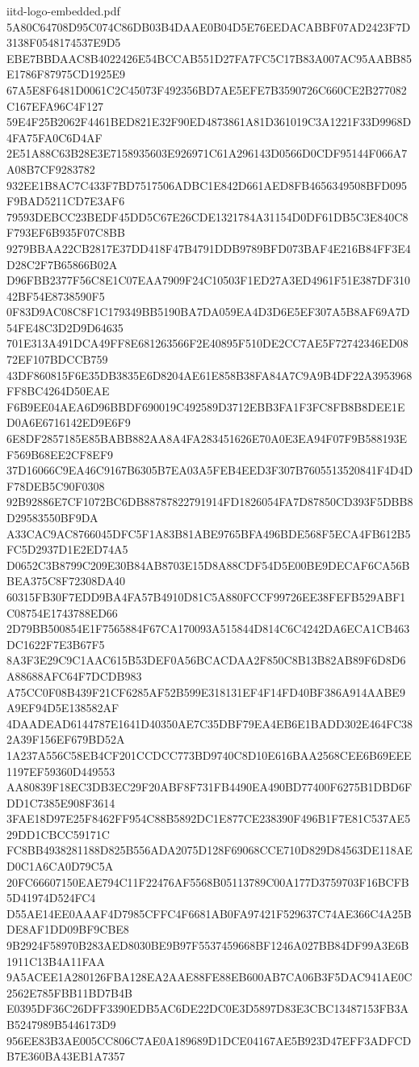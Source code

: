 \begin{filecontents*}[overwrite]{iitd-logo-embedded.pdf}
5A80C64708D95C074C86DB03B4DAAE0B04D5E76EEDACABBF07AD2423F7D3138F0548174537E9D5
EBE7BBDAAC8B4022426E54BCCAB551D27FA7FC5C17B83A007AC95AABB85E1786F87975CD1925E9
67A5E8F6481D0061C2C45073F492356BD7AE5EFE7B3590726C660CE2B277082C167EFA96C4F127
59E4F25B2062F4461BED821E32F90ED4873861A81D361019C3A1221F33D9968D4FA75FA0C6D4AF
2E51A88C63B28E3E7158935603E926971C61A296143D0566D0CDF95144F066A7A08B7CF9283782
932EE1B8AC7C433F7BD7517506ADBC1E842D661AED8FB4656349508BFD095F9BAD5211CD7E3AF6
79593DEBCC23BEDF45DD5C67E26CDE1321784A31154D0DF61DB5C3E840C8F793EF6B935F07C8BB
9279BBAA22CB2817E37DD418F47B4791DDB9789BFD073BAF4E216B84FF3E4D28C2F7B65866B02A
D96FBB2377F56C8E1C07EAA7909F24C10503F1ED27A3ED4961F51E387DF31042BF54E8738590F5
0F83D9AC08C8F1C179349BB5190BA7DA059EA4D3D6E5EF307A5B8AF69A7D54FE48C3D2D9D64635
701E313A491DCA49FF8E681263566F2E40895F510DE2CC7AE5F72742346ED0872EF107BDCCB759
43DF860815F6E35DB3835E6D8204AE61E858B38FA84A7C9A9B4DF22A3953968FF8BC4264D50EAE
F6B9EE04AEA6D96BBDF690019C492589D3712EBB3FA1F3FC8FB8B8DEE1ED0A6E6716142ED9E6F9
6E8DF2857185E85BABB882AA8A4FA283451626E70A0E3EA94F07F9B588193EF569B68EE2CF8EF9
37D16066C9EA46C9167B6305B7EA03A5FEB4EED3F307B7605513520841F4D4DF78DEB5C90F0308
92B92886E7CF1072BC6DB88787822791914FD1826054FA7D87850CD393F5DBB8D29583550BF9DA
A33CAC9AC8766045DFC5F1A83B81ABE9765BFA496BDE568F5ECA4FB612B5FC5D2937D1E2ED74A5
D0652C3B8799C209E30B84AB8703E15D8A88CDF54D5E00BE9DECAF6CA56BBEA375C8F72308DA40
60315FB30F7EDD9BA4FA57B4910D81C5A880FCCF99726EE38FEFB529ABF1C08754E1743788ED66
2D79BB500854E1F7565884F67CA170093A515844D814C6C4242DA6ECA1CB463DC1622F7E3B67F5
8A3F3E29C9C1AAC615B53DEF0A56BCACDAA2F850C8B13B82AB89F6D8D6A88688AFC64F7DCDB983
A75CC0F08B439F21CF6285AF52B599E318131EF4F14FD40BF386A914AABE9A9EF94D5E138582AF
4DAADEAD6144787E1641D40350AE7C35DBF79EA4EB6E1BADD302E464FC382A39F156EF679BD52A
1A237A556C58EB4CF201CCDCC773BD9740C8D10E616BAA2568CEE6B69EEE1197EF59360D449553
AA80839F18EC3DB3EC29F20ABF8F731FB4490EA490BD77400F6275B1DBD6FDD1C7385E908F3614
3FAE18D97E25F8462FF954C88B5892DC1E877CE238390F496B1F7E81C537AE529DD1CBCC59171C
FC8BB4938281188D825B556ADA2075D128F69068CCE710D829D84563DE118AED0C1A6CA0D79C5A
20FC66607150EAE794C11F22476AF5568B05113789C00A177D3759703F16BCFB5D41974D524FC4
D55AE14EE0AAAF4D7985CFFC4F6681AB0FA97421F529637C74AE366C4A25BDE8AF1DD09BF9CBE8
9B2924F58970B283AED8030BE9B97F5537459668BF1246A027BB84DF99A3E6B1911C13B4A11FAA
9A5ACEE1A280126FBA128EA2AAE88FE88EB600AB7CA06B3F5DAC941AE0C2562E785FBB11BD7B4B
E0395DF36C26DFF3390EDB5AC6DE22DC0E3D5897D83E3CBC13487153FB3AB5247989B5446173D9
956EE83B3AE005CC806C7AE0A189689D1DCE04167AE5B923D47EFF3ADFCDB7E360BA43EB1A7357

\end{filecontents*}

